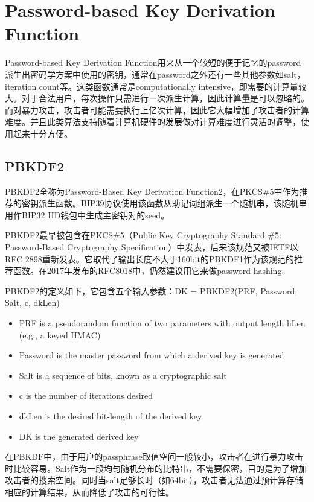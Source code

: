 \section{Password-based Key Derivation Function}

Password-based Key Derivation Function用来从一个较短的便于记忆的password派生出密码学方案中使用的密钥，通常在password之外还有一些其他参数如salt，iteration count等。这类函数通常是computationally intensive，即需要的计算量较大。对于合法用户，每次操作只需进行一次派生计算，因此计算量是可以忽略的。而对暴力攻击，攻击者可能需要执行上亿次计算，因此它大幅增加了攻击者的计算难度。并且此类算法支持随着计算机硬件的发展做对计算难度进行灵活的调整，使用起来十分方便。

\subsection{PBKDF2}

PBKDF2全称为Password-Based Key Derivation Function2，在PKCS\#5中作为推荐的密钥派生函数。BIP39协议使用该函数从助记词组派生一个随机串，该随机串用作BIP32 HD钱包中生成主密钥对的seed。  

PBKDF2最早被包含在PKCS\#5（Public Key Cryptography Standard \#5: Password-Based Cryptography Specification）中发表，后来该规范又被IETF以RFC 2898重新发表。它取代了输出长度不大于160bit的PBKDF1作为该规范的推荐函数。在2017年发布的RFC8018中，仍然建议用它来做password hashing.

PBKDF2的定义如下，它包含五个输入参数：\textsf{DK = PBKDF2(PRF, Password, Salt, c, dkLen)}
\begin{itemize}
\item PRF is a pseudorandom function of two parameters with output length hLen (e.g., a keyed HMAC)
\item Password is the master password from which a derived key is generated
\item Salt is a sequence of bits, known as a cryptographic salt
\item c is the number of iterations desired
\item dkLen is the desired bit-length of the derived key
\item DK is the generated derived key
\end{itemize}


在PBKDF中，由于用户的passphrase取值空间一般较小，攻击者在进行暴力攻击时比较容易。Salt作为一段均匀随机分布的比特串，不需要保密，目的是为了增加攻击者的搜索空间。同时当salt足够长时（如64bit），攻击者无法通过预计算存储相应的计算结果，从而降低了攻击的可行性。


